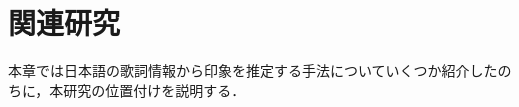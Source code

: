 \documentclass[a4paper,11pt,oneside,openany]{jsbook}
\begin{document}
\chapter{関連研究}
本章では日本語の歌詞情報から印象を推定する手法についていくつか紹介したのちに，本研究の位置付けを説明する．





%
\end{document}
